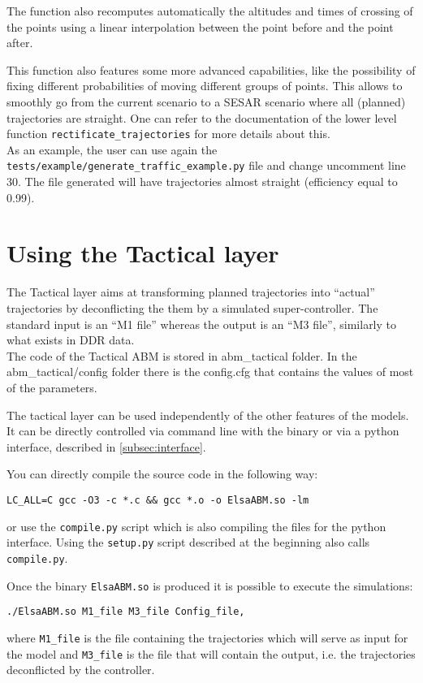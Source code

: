 \documentclass[12pt]{article}
\begin{document}
The function also recomputes automatically the altitudes and times of crossing of the points using a linear interpolation between the point before and the point after.

This function also features some more advanced capabilities, like the possibility of fixing different probabilities of moving different groups of points. This allows to smoothly go from the current scenario to a SESAR scenario where all (planned) trajectories are straight. One can refer to the documentation of the lower level function  \verb|rectificate_trajectories| for more details about this.
\\

As an example, the user can use again the \verb|tests/example/generate_traffic_example.py| file and change uncomment line 30. The file generated will have trajectories almost straight (efficiency equal to 0.99).

\section{Using the Tactical layer}
\label{sec:tactical}
The Tactical layer aims at transforming planned trajectories into ``actual'' trajectories by deconflicting the them by a simulated super-controller. The standard input is an ``M1 file'' whereas the output is an ``M3 file'', similarly to what exists in DDR data.
\\

The code of the Tactical ABM is stored in abm\_tactical folder. In the abm\_tactical/config folder there is the config.cfg that contains the values of most of the parameters.

The tactical layer can be used independently of the other features of the models. It can be directly controlled via command line with the binary or via a python interface, described in \ref{subsec:interface}.

You can directly compile the source code in the following way:

\begin{verbatim}
LC_ALL=C gcc -O3 -c *.c && gcc *.o -o ElsaABM.so -lm
\end{verbatim}
or use the \verb|compile.py| script which is also compiling the files for the python interface. Using the \verb|setup.py| script described at the beginning also calls \verb|compile.py|.

Once the binary \verb|ElsaABM.so| is produced it is possible to execute the simulations:

\begin{verbatim}
./ElsaABM.so M1_file M3_file Config_file,
\end{verbatim}
where \verb|M1_file| is the file containing the trajectories which will serve as input for the model and \verb|M3_file| is the file that will contain the output, i.e. the trajectories deconflicted by the controller.
\\
\end{document}
